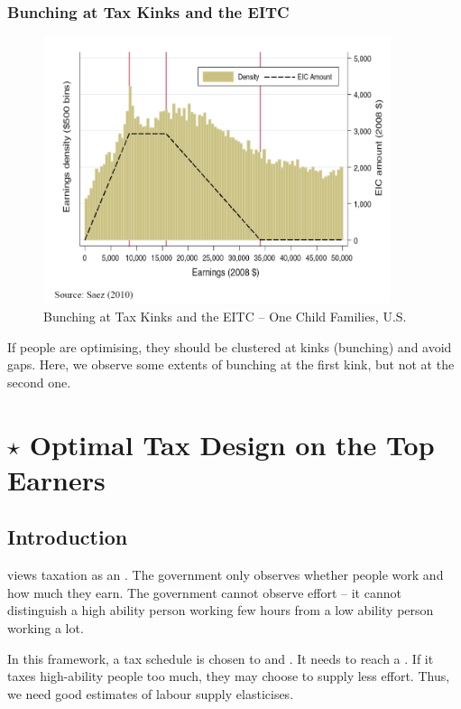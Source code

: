         \subsubsection{Bunching at Tax Kinks and the EITC}

            \begin{figure}[H]
                \centering
                \includegraphics[width=4in]{images/ch13/US_Bunching_EITC_1.png}
                \caption{Bunching at Tax Kinks and the EITC -- One Child Families, U.S.}
            \end{figure}

            If people are optimising, they should be clustered at kinks (bunching) and avoid gaps. Here, we observe some extents of bunching at the first kink, but not at the second one.
        

\section{$\star$ Optimal Tax Design on the Top Earners}\label{sec:optimal_top_tax}

    \subsection{Introduction}

        \cite{mirrlees_theory_1971} views taxation as an . The government only observes whether people work and how much they earn. The government cannot observe effort -- it cannot distinguish a high ability person working few hours from a low ability person working a lot.

        In this framework, a tax schedule is chosen to  and . It needs to reach a . If it taxes high-ability people too much, they may choose to supply less effort. Thus, we need good estimates of labour supply elasticises.

